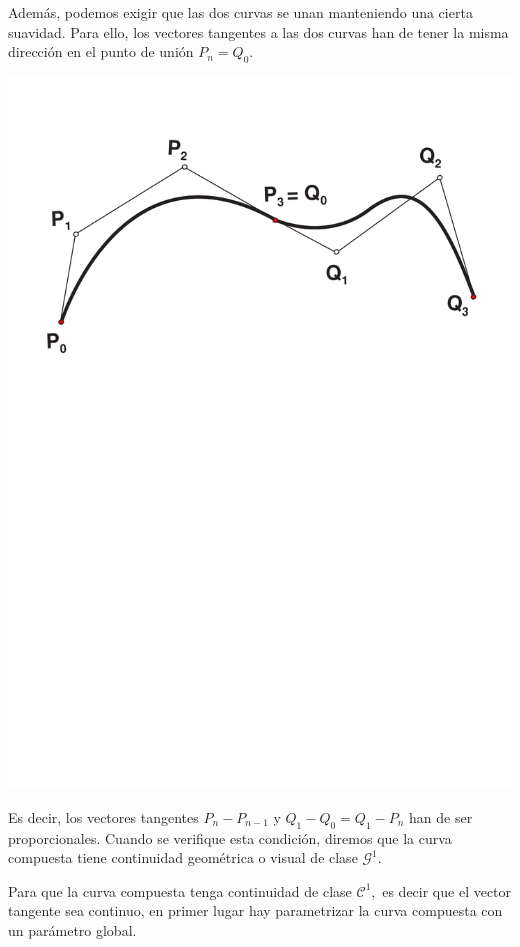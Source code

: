 \documentclass[ebook,oneside]{memoir}
\begin{document}
Adem\'{a}s, podemos exigir que las dos curvas se unan manteniendo una cierta suavidad. Para ello, los vectores tangentes a las dos curvas han de tener la misma direcci\'{o}n en el punto de uni\'{o}n $P_n=Q_0.$

\begin{center}
\includegraphics[scale=0.55]{3_15.pdf}
\end{center}

Es decir, los vectores tangentes $P_n-P_{n-1}$ y $Q_1-Q_0=Q_1-P_n$ han de ser proporcionales. Cuando se verifique esta condici\'{o}n, diremos que la curva compuesta tiene continuidad geom\'{e}trica o visual de clase ${\mathcal  G}^1.$

Para que la curva compuesta tenga continuidad de clase ${\mathcal  C}^1,$ es decir que el vector tangente sea continuo, en primer lugar hay parametrizar la curva compuesta con un par\'{a}metro global.
\end{document}

